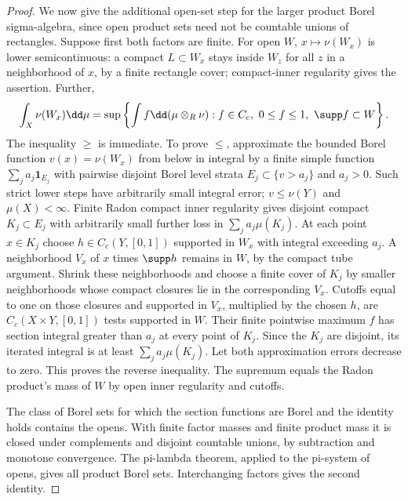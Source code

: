 \documentclass[11pt,oneside,openany]{book}
\theoremstyle{definition}
\theoremstyle{remark}
\newcommand{\one}{\mathbf1}\newcommand{\ind}[1]{\mathbf1_{#1}}
\begin{document}
\begin{proof}
We now give the additional open-set step for the larger product Borel sigma-algebra, since open product sets need not be countable unions of rectangles. Suppose first both factors are finite. For open $W$, $x\mapsto\nu(W_x)$ is lower semicontinuous: a compact $L\subset W_x$ stays inside $W_z$ for all $z$ in a neighborhood of $x$, by a finite rectangle cover; compact-inner regularity gives the assertion. Further,
\[\int_X\nu(W_x)\dd\mu=\sup\left\{\int f\dd(\mu\otimes_R\nu):f\in C_c,\ 0\le f\le1,\ \supp f\subset W\right\}.
\]
The inequality $\ge$ is immediate. To prove $\le$, approximate the bounded Borel function $v(x)=\nu(W_x)$ from below in integral by a finite simple function $\sum_ja_j\one_{E_j}$ with pairwise disjoint Borel level strata $E_j\subset\{v>a_j\}$ and $a_j>0$. Such strict lower steps have arbitrarily small integral error; $v\le\nu(Y)$ and $\mu(X)<\infty$. Finite Radon compact inner regularity gives disjoint compact $K_j\subset E_j$ with arbitrarily small further loss in $\sum_ja_j\mu(K_j)$. At each point $x\in K_j$ choose $h\in C_c(Y,[0,1])$ supported in $W_x$ with integral exceeding $a_j$. A neighborhood $V_x$ of $x$ times $\supp h$ remains in $W$, by the compact tube argument. Shrink these neighborhoods and choose a finite cover of $K_j$ by smaller neighborhoods whose compact closures lie in the corresponding $V_x$. Cutoffs equal to one on those closures and supported in $V_x$, multiplied by the chosen $h$, are $C_c(X\times Y,[0,1])$ tests supported in $W$. Their finite pointwise maximum $f$ has section integral greater than $a_j$ at every point of $K_j$. Since the $K_j$ are disjoint, its iterated integral is at least $\sum_ja_j\mu(K_j)$. Let both approximation errors decrease to zero. This proves the reverse inequality. The supremum equals the Radon product's mass of $W$ by open inner regularity and cutoffs.

The class of Borel sets for which the section functions are Borel and the identity holds contains the opens. With finite factor masses and finite product mass it is closed under complements and disjoint countable unions, by subtraction and monotone convergence. The pi-lambda theorem, applied to the pi-system of opens, gives all product Borel sets. Interchanging factors gives the second identity.


\end{proof}
\end{document}
